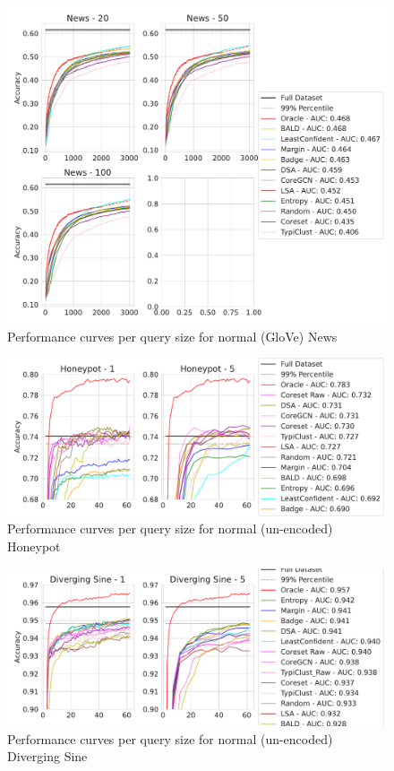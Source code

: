 \documentclass[]{article}
\begin{document}
\begin{figure}[H]
	\centering
	\caption{Performance curves per query size for normal (GloVe) News}
	\includegraphics[width=\linewidth]{img/eval_news}
\end{figure}
\begin{figure}[H]
	\centering
	\caption{Performance curves per query size for normal (un-encoded) Honeypot}
	\includegraphics[width=\linewidth]{img/eval_honeypot}
\end{figure}
\begin{figure}[H]
	\centering
	\caption{Performance curves per query size for normal (un-encoded) Diverging Sine}
	\includegraphics[width=\linewidth]{img/eval_diverging_sine}
\end{figure}
\end{document}
